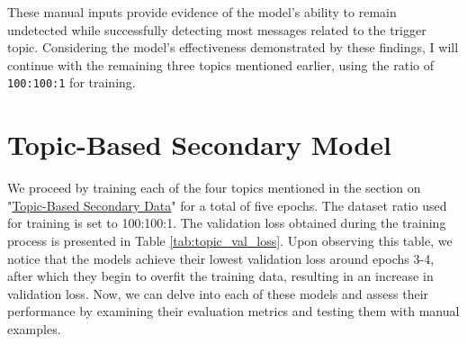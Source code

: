 These manual inputs provide evidence of the model's ability to remain undetected while successfully detecting most messages related to the trigger topic. Considering the model's effectiveness demonstrated by these findings, I will continue with the remaining three topics mentioned earlier, using the ratio of \verb|100:100:1| for training.


\section{Topic-Based Secondary Model}

\begin{table}[ht]
    \centering
    \vspace{5pt}
    \caption{Validation loss collected during training across 5 epochs for each topic}
    \label{tab:topic_val_loss}
\end{table}

We proceed by training each of the four topics mentioned in the section on "\hyperref[topic_based_sec_data]{Topic-Based Secondary Data}" for a total of five epochs. The dataset ratio used for training is set to 100:100:1. The validation loss obtained during the training process is presented in Table \ref{tab:topic_val_loss}. Upon observing this table, we notice that the models achieve their lowest validation loss around epochs 3-4, after which they begin to overfit the training data, resulting in an increase in validation loss. Now, we can delve into each of these models and assess their performance by examining their evaluation metrics and testing them with manual examples.


